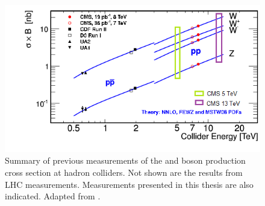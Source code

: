 \begin{figure}
\centering
\includegraphics[width=0.6\linewidth]{plots/Intro/summary_v2.png}
\caption{Summary of previous measurements of the \W and \Z boson production cross section at hadron colliders. Not shown are the results from \sh LHC measurements. Measurements presented in this thesis are also indicated. Adapted from \cite{article_wzsummary}.}
\label{fig:intro:summary:meas}
\end{figure}